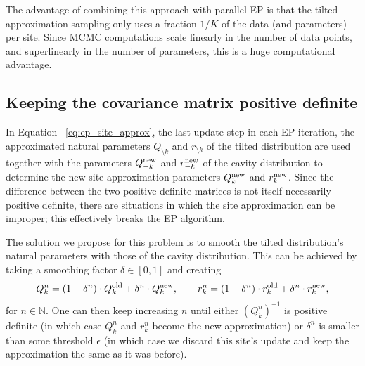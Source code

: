 The advantage of combining this approach with parallel EP is that the tilted approximation sampling only uses a fraction $1/K$ of the data (and parameters) per site. Since MCMC computations scale linearly in the number of data points, and superlinearly in the number of parameters, this is a huge computational advantage.

\subsection{Keeping the covariance matrix positive definite}
\label{subsec:ep_alg_eigens}

In Equation~ \ref{eq:ep_site_approx}, the last update step in each EP iteration, the approximated natural parameters $Q_{\setminus k}$ and $r_{\setminus k}$ of the tilted distribution are used together with the parameters $Q^{\rm new}_{- k}$ and $r^{\rm new}_{- k}$ of the cavity distribution to determine the new site approximation parameters $Q^{\rm new}_{k}$ and $r^{\rm new}_{k}$. Since the difference between the two positive definite matrices is not itself necessarily positive definite, there are situations in which the site approximation can be improper; this effectively breaks the EP algorithm.

The solution we propose for this problem is to smooth the tilted distribution's natural parameters with those of the cavity distribution. This can be achieved by taking a smoothing factor $\delta \in [0,1]$ and creating
\begin{align*}
Q^n_k = (1 - \delta^n) \cdot Q^{\rm old}_k + \delta^n \cdot Q^{\rm new}_k, \qquad
r^n_k = (1 - \delta^n) \cdot r^{\rm old}_k + \delta^n \cdot r^{\rm new}_k, \nonumber
\end{align*}
for $n \in \mathbb{N}$. One can then keep increasing $n$ until either $(Q^n_k)^{-1}$ is positive definite (in which case $Q^n_k$ and $r^n_k$ become the new approximation) or $\delta^n$ is smaller than some threshold $\epsilon$ (in which case we discard this site's update and keep the approximation the same as it was before). 